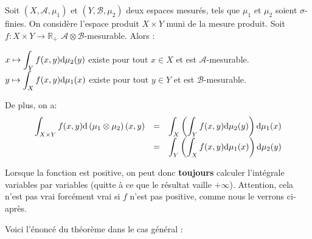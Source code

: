 \documentclass[../integ-proba.tex]{subfiles}
\begin{document}
\begin{thm}
  \label{thm:fubini_positif}
  Soit $\left(X, \mathcal{A}, \mu_1\right)$ et $\left(Y, \mathcal{B}, \mu_2\right)$ deux espaces mesurés, tels que $\mu_1$ et $\mu_2$ soient $\sigma$-finies.
  On considère l'espace produit $X \times Y$ muni de la mesure produit.
  Soit $f:X \times Y \rightarrow \mathbb{R}_+$ $\mathcal{A} \otimes \mathcal{B}$-mesurable.
  Alors :
  \begin{itemize}
    \itemb $\displaystyle x \mapsto \int_Y f(x,y) \textnormal{d}\mu_2(y)$ existe pour tout $x \in X$ et est $\mathcal{A}$-mesurable.
    \itemb $\displaystyle y \mapsto \int_X f(x,y) \textnormal{d}\mu_1(x)$ existe pour tout $y \in Y$ et est $\mathcal{B}$-mesurable.
  \end{itemize}

  De plus, on a:
  $$
  {
  \everymath={\displaystyle}
  \begin{array}{rcl}
    \int_{X \times Y} f(x,y) \textnormal{d} \left(\mu_1 \otimes \mu_2 \right) (x,y) & = & \int_X \left( \int_Y f(x,y) \textnormal{d} \mu_2(y) \right) \textnormal{d} \mu_1(x)\\
                                                                                    & = & \int_Y \left( \int_X f(x,y) \textnormal{d} \mu_1(x) \right) \textnormal{d} \mu_2(y)\\
  \end{array}
  }
  $$
\end{thm}

\begin{rem}
  Lorsque la fonction est positive, on peut donc \textbf{toujours} calculer l'intégrale variables par variables (quitte à ce que le résultat vaille $+\infty$).
  Attention, cela n'est pas vrai forcément vrai si $f$ n'est pas positive, comme nous le verrons ci-après.
\end{rem}

Voici l'énoncé du théorème dans le cas général :
\end{document}
